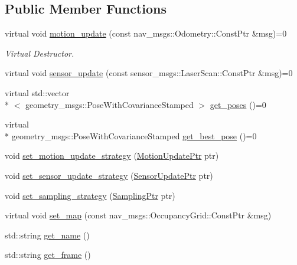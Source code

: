 \subsection*{Public Member Functions}
\begin{DoxyCompactItemize}
\item 
virtual void \hyperlink{classPoseFilter_ad40e8f2ae14a14211f3729a4869e312d}{motion\-\_\-update} (const nav\-\_\-msgs\-::\-Odometry\-::\-Const\-Ptr \&msg)=0
\begin{DoxyCompactList}\small\item\em Virtual Destructor. \end{DoxyCompactList}\item 
virtual void \hyperlink{classPoseFilter_a42d8e867c65b45894f934d7b2c60b684}{sensor\-\_\-update} (const sensor\-\_\-msgs\-::\-Laser\-Scan\-::\-Const\-Ptr \&msg)=0
\item 
virtual std\-::vector\\*
$<$ geometry\-\_\-msgs\-::\-Pose\-With\-Covariance\-Stamped $>$ \hyperlink{classPoseFilter_af84e0ef9dbca4892408930383acbe810}{get\-\_\-poses} ()=0
\item 
virtual \\*
geometry\-\_\-msgs\-::\-Pose\-With\-Covariance\-Stamped \hyperlink{classPoseFilter_a64686b9d07bd339cdd7c269b4c173404}{get\-\_\-best\-\_\-pose} ()=0
\item 
void \hyperlink{classPoseFilter_aef63acc2ba1bf411909cae2992a90c7d}{set\-\_\-motion\-\_\-update\-\_\-strategy} (\hyperlink{motion__update_8h_aec1cf0d54c70c4dacac639ab488bf948}{Motion\-Update\-Ptr} ptr)
\item 
void \hyperlink{classPoseFilter_a771670fb9bcbbab0964a7310343b2201}{set\-\_\-sensor\-\_\-update\-\_\-strategy} (\hyperlink{sensor__update_8h_a7bfe6ec1a05f2f99b0974d5cbd8b8b7b}{Sensor\-Update\-Ptr} ptr)
\item 
void \hyperlink{classPoseFilter_af9c8fa9dcbe05ae4be64823d894e6514}{set\-\_\-sampling\-\_\-strategy} (\hyperlink{sampling_8h_adf4afed667a21b30f8ff816aae609bf7}{Sampling\-Ptr} ptr)
\item 
virtual void \hyperlink{classPoseFilter_ab5a6b461992f3ce218b308a59f50a83f}{set\-\_\-map} (const nav\-\_\-msgs\-::\-Occupancy\-Grid\-::\-Const\-Ptr \&msg)
\item 
std\-::string \hyperlink{classPoseFilter_a7536e09a70e3683a8de5c94b9a1b5a53}{get\-\_\-name} ()
\item 
std\-::string \hyperlink{classPoseFilter_a566fe40b9b00a6ebedfb615acaf80142}{get\-\_\-frame} ()
\end{DoxyCompactItemize}
